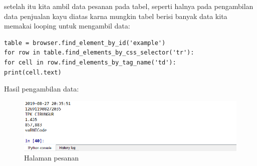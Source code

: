 setelah itu kita ambil data pesanan pada tabel, seperti halnya pada pengambilan data penjualan kayu diatas karna mungkin tabel berisi banyak data kita memakai looping untuk mengambil data:
\begin{verbatim}
table = browser.find_element_by_id('example')
for row in table.find_elements_by_css_selector('tr'):
for cell in row.find_elements_by_tag_name('td'):
print(cell.text)
\end{verbatim}
\newpage
Hasil pengambilan data:
\begin{figure}[h]
	\centering
	\includegraphics[scale=0.55]{figures/8datapesan}
	\caption{Halaman pesanan}
\end{figure}


\newpage
